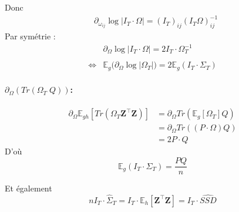 \documentclass[11pt,a4paper]{article}
\newcommand{\Zbf}{\boldsymbol{Z}}
\newcommand{\Esp}{\mathds{E}}
\begin{document}
Donc 
\begin{align}
         &\partial_{\omega_{ij}} \log |I_T\cdot \Omega| = (I_T)_{ij} (I_T\Omega)_{ij}^{-1}
\end{align}
Par symétrie :
\begin{align}
    &\partial_\Omega \log |I_T\cdot \Omega| = 2I_T \cdot \Omega_T^{-1}\\\\
    \iff &\Esp_g \big( \partial_\Omega \log |\Omega_T| \big) = 2\Esp_g (I_T\cdot \Sigma_T) 
\end{align}

\paragraph{\underline{$ \partial_\Omega (Tr(\Omega_T \; Q ))$}:}
\begin{align}
    \partial_\Omega \Esp_{gh}[Tr(\Omega_T \Zbf^\intercal \Zbf)]&=\partial_\Omega Tr(\Esp_g[\Omega_T]Q)\\
    &=\partial_\Omega Tr((P\cdot\Omega)Q)\\
    &=2P\cdot Q
\end{align}
D'où $$ \Esp_g (I_T\cdot \Sigma_T)  = \frac{PQ}{n}$$

Et également 
$$\boxed{n I_T\cdot \hat{\Sigma}_T = I_T\cdot \Esp_h[\Zbf^\intercal \Zbf] = I_T\cdot \widehat{SSD}}$$
\end{document}
